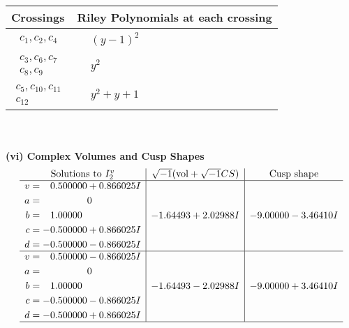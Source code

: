 \documentclass[1p]{elsarticle_modified}
\theoremstyle{definition}
\newcommand{\I}{\sqrt{-1}}
\begin{document}
\begin{tabular}{m{50pt}|m{274pt}}
Crossings & \hspace{64pt}Riley Polynomials at each crossing \\
\hline $$\begin{aligned}c_{1},c_{2},c_{4}\end{aligned}$$&$\begin{aligned}
&(y-1)^2
\end{aligned}$\\
\hline $$\begin{aligned}c_{3},c_{6},c_{7}\\c_{8},c_{9}\end{aligned}$$&$\begin{aligned}
&y^2
\end{aligned}$\\
\hline $$\begin{aligned}c_{5},c_{10},c_{11}\\c_{12}\end{aligned}$$&$\begin{aligned}
&y^2+y+1
\end{aligned}$\\
\hline
\end{tabular}\\~\\
\newpage\flushleft \textbf{(vi) Complex Volumes and Cusp Shapes}
$$\begin{array}{c|c|c}  
\text{Solutions to }I^v_{2}& \I (\text{vol} + \sqrt{-1}CS) & \text{Cusp shape}\\
 \hline 
\begin{aligned}
v &= \phantom{-}0.500000 + 0.866025 I \\
a &= \phantom{-0.000000 } 0 \\
b &= \phantom{-}1.00000\phantom{ +0.000000I} \\
c &= -0.500000 + 0.866025 I \\
d &= -0.500000 - 0.866025 I\end{aligned}
 & -1.64493 + 2.02988 I & -9.00000 - 3.46410 I \\ \hline\begin{aligned}
v &= \phantom{-}0.500000 - 0.866025 I \\
a &= \phantom{-0.000000 } 0 \\
b &= \phantom{-}1.00000\phantom{ +0.000000I} \\
c &= -0.500000 - 0.866025 I \\
d &= -0.500000 + 0.866025 I\end{aligned}
 & -1.64493 - 2.02988 I & -9.00000 + 3.46410 I\\
 \hline 
 \end{array}$$\newpage\newpage\renewcommand{\arraystretch}{1}
\end{document}
